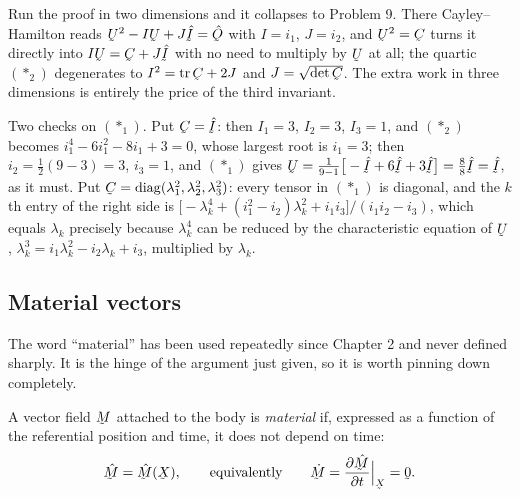 \begin{remark}\label{rem:Uclosed2d}
Run the proof in two dimensions and it collapses to Problem 9. There
Cayley--Hamilton reads $\bU^{2}-I\bU+J\hI=\hOb$ with $I=i_{1}$, $J=i_{2}$,
and $\bU^{2}=\bC$ turns it directly into $I\bU=\bC+J\hI$ with no need to
multiply by $\bU$ at all; the quartic $(\ast_{2})$ degenerates to
$I^{2}=\tr\bC+2J$ and $J=\sqrt{\det\bC}$. The extra work in three
dimensions is entirely the price of the third invariant.

Two checks on $(\ast_{1})$. Put $\bC=\hI$: then $I_{1}=3$, $I_{2}=3$,
$I_{3}=1$, and $(\ast_{2})$ becomes $i_{1}^{4}-6i_{1}^{2}-8i_{1}+3=0$,
whose largest root is $i_{1}=3$; then $i_{2}=\tfrac12(9-3)=3$, $i_{3}=1$,
and $(\ast_{1})$ gives
$\bU=\tfrac{1}{9-1}\big[-\hI+6\hI+3\hI\big]=\tfrac{8}{8}\hI=\hI$, as it
must. Put $\bC=\operatorname{diag}(\lambda_{1}^{2},\lambda_{2}^{2},
\lambda_{3}^{2})$: every tensor in $(\ast_{1})$ is diagonal, and the
$k$th entry of the right side is
$\big[-\lambda_{k}^{4}+(i_{1}^{2}-i_{2})\lambda_{k}^{2}+i_{1}i_{3}\big]
/(i_{1}i_{2}-i_{3})$, which equals $\lambda_{k}$ precisely because
$\lambda_{k}^{4}$ can be reduced by the characteristic equation of $\bU$,
$\lambda_{k}^{3}=i_{1}\lambda_{k}^{2}-i_{2}\lambda_{k}+i_{3}$, multiplied
by $\lambda_{k}$.
\end{remark}

\subsection*{Material vectors}

The word ``material'' has been used repeatedly since Chapter 2 and never
defined sharply. It is the hinge of the argument just given, so it is
worth pinning down completely.

\begin{definition}\label{def:matvec}
A vector field $\bM$ attached to the body is \emph{material} if, expressed
as a function of the referential position and time, it does not depend on
time:
\[
   \hat\bM=\hat\bM(\bX),\qquad\text{equivalently}\qquad
   \dot{\bM}=\frac{\partial\hat\bM}{\partial t}\Big|_{\bX}=\bze .
\]
\end{definition}


